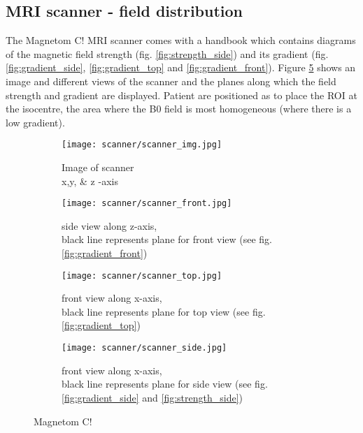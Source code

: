 \subsection{MRI scanner - field distribution}
\label{sec:magnetom}

The Magnetom C! MRI scanner comes with a handbook which contains diagrams of the magnetic field strength (fig. \ref{fig:strength_side}) and its gradient (fig. \ref{fig:gradient_side}, \ref{fig:gradient_top} and \ref{fig:gradient_front}).
Figure \ref{fig:scanner} shows an image and different views of the scanner and the planes along which the field strength and gradient are displayed.
Patient are positioned as to place the ROI at the isocentre, the area where the B0 field is most homogeneous (where there is a low gradient).

\begin{figure}[!htb]
\centering
  \begin{subfigure}[b]{0.4\textwidth}
	\centering
	\texttt{[image: scanner/scanner\_img.jpg]}
	\caption{Image of scanner\\ x,y, \& z -axis}
	\label{fig:scanner_image}
  \end{subfigure}
    \hfill
  \begin{subfigure}[b]{0.4\textwidth}
  	\centering
    \texttt{[image: scanner/scanner\_front.jpg]}
    \caption{side view along z-axis,\\ black line represents plane for front view (see fig. \ref{fig:gradient_front})}
    \label{fig:scanner_front}
  \end{subfigure}
  
  \begin{subfigure}[b]{0.4\textwidth}
   	\centering
   	\texttt{[image: scanner/scanner\_top.jpg]}
   	\caption{front view along x-axis,\\ black line represents plane for top view (see fig. \ref{fig:gradient_top})}
   	\label{fig:scanner_top}
  \end{subfigure}
    \hfill
  \begin{subfigure}[b]{0.4\textwidth}
  	\centering
  	\texttt{[image: scanner/scanner\_side.jpg]}
  	\caption{front view along x-axis,\\ black line represents plane for side view (see fig. \ref{fig:gradient_side} and \ref{fig:strength_side})}
  	\label{fig:scanner_side}
  \end{subfigure}
  \caption{Magnetom C! \cite{magnetom_handbook}}
  \label{fig:scanner}
\end{figure}

